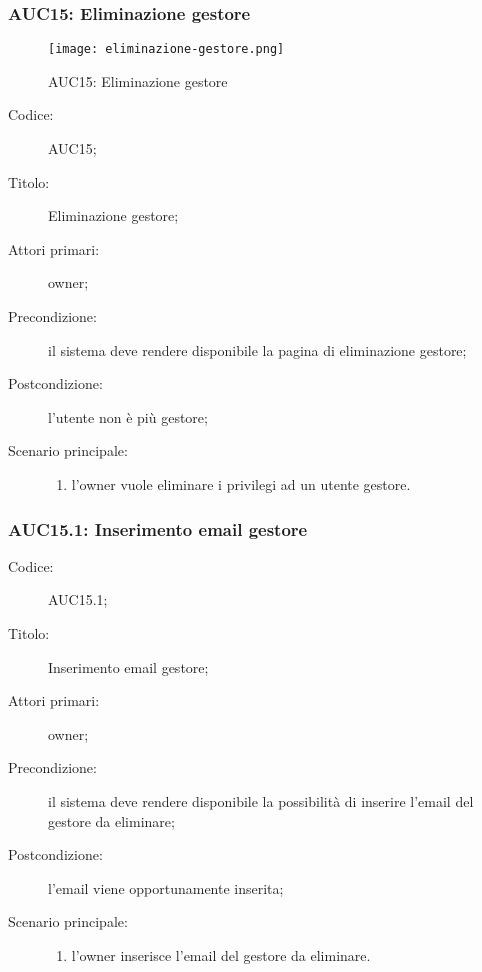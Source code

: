 \documentclass[../../../analisi-dei-requisiti.tex]{subfiles}
\begin{document}
\subsubsection{AUC15: Eliminazione gestore}%
\label{subs:AUC15}

\begin{figure}[H]
  \centering
  \texttt{[image: eliminazione-gestore.png]}
  \caption{AUC15: Eliminazione gestore}%
  \label{fig:AUC15}
\end{figure}

\begin{description}
  \item[Codice:] AUC15;
  \item[Titolo:] Eliminazione gestore;
  \item[Attori primari:] owner;
  \item[Precondizione:] il sistema deve rendere disponibile la pagina di eliminazione gestore;
  \item[Postcondizione:] l'utente non è più gestore;
  \item[Scenario principale:]
  \begin{enumerate}
    \item l'owner vuole eliminare i privilegi ad un utente gestore.
  \end{enumerate}
\end{description}

\subsubsection{AUC15.1: Inserimento email gestore}%
\label{subs:AUC15.1}
\begin{description}
  \item[Codice:] AUC15.1;
  \item[Titolo:] Inserimento email gestore;
  \item[Attori primari:] owner;
  \item[Precondizione:] il sistema deve rendere disponibile la possibilità di inserire l'email del gestore da eliminare;
  \item[Postcondizione:] l'email viene opportunamente inserita;
  \item[Scenario principale:]
  \begin{enumerate}
    \item l'owner inserisce l'email del gestore da eliminare.
  \end{enumerate}
\end{description}
\end{document}
